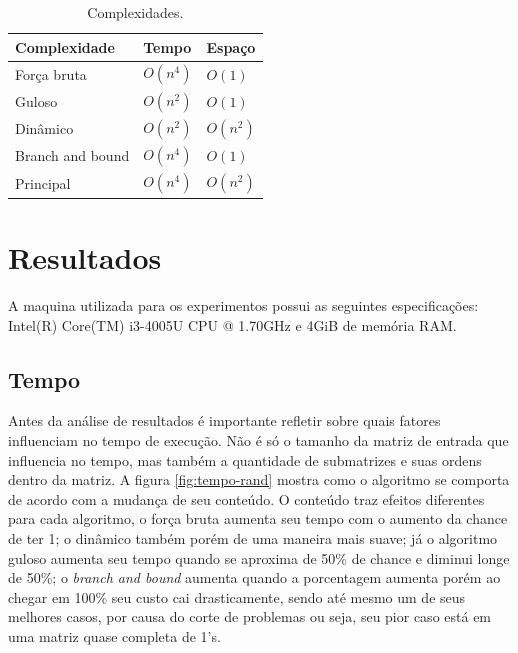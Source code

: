 \documentclass[10.9pt]{article}
\begin{document}
\begin{table}[htbp]
\centering
\begin{tabular}{lll}
\hline
Complexidade & Tempo & Espaço\\
\hline
Força bruta & \(O(n^4)\) & \(O(1)\)\\
Guloso & \(O(n^2)\) & \(O(1)\)\\
Dinâmico & \(O(n^2)\) & \(O(n^2)\)\\
Branch and bound & \(O(n^4)\) & \(O(1)\)\\
Principal & \(O(n^4)\) & \(O(n^2)\)\\
\hline
\end{tabular}
\caption{\label{tab:org6b408f4}
Complexidades.}

\end{table}
\section{Resultados}
\label{sec:orgff951b8}
A maquina utilizada para os experimentos possui as seguintes especificações: Intel(R) Core(TM) i3-4005U CPU @ 1.70GHz e 4GiB de memória RAM.
\subsection{Tempo}
\label{sec:orge1fc06c}
Antes da análise de resultados é importante refletir sobre quais fatores influenciam no tempo de execução. Não é só o tamanho da matriz de entrada que influencia no tempo, mas também a quantidade de submatrizes e suas ordens dentro da matriz. A figura \ref{fig:tempo-rand} mostra como o algoritmo se comporta de acordo com a mudança de seu conteúdo. O conteúdo traz efeitos diferentes para cada algoritmo, o força bruta aumenta seu tempo com o aumento da chance de ter 1; o dinâmico também porém de uma maneira mais suave; já o algoritmo guloso aumenta seu tempo quando se aproxima de 50\% de chance e diminui longe de 50\%; o \emph{branch and bound} aumenta quando a porcentagem aumenta porém ao chegar em 100\% seu custo cai drasticamente, sendo até mesmo um de seus melhores casos, por causa do corte de problemas ou seja, seu pior caso está em uma matriz quase completa de 1's.
\end{document}
